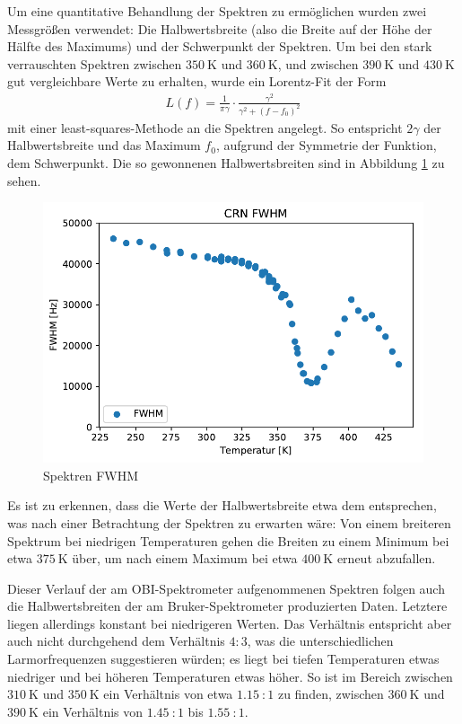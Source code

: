 Um eine quantitative Behandlung der Spektren zu ermöglichen wurden zwei Messgrößen verwendet: Die Halbwertsbreite (also die Breite auf der Höhe der Hälfte des Maximums) und der Schwerpunkt der Spektren. Um bei den stark verrauschten Spektren zwischen $\SI{350}{\kelvin}$ und $\SI{360}{\kelvin}$, und zwischen $\SI{390}{\kelvin}$ und $\SI{430}{\kelvin}$ gut vergleichbare Werte zu erhalten, wurde ein Lorentz-Fit der Form
\begin{align}
	L(f) = \frac{1}{\pi \gamma} \cdot \frac{\gamma^2}{\gamma^2 + (f - f_0)^2} \label{eqn:res:lorentz}
\end{align}
mit einer least-squares-Methode an die Spektren angelegt. So entspricht $2 \gamma$ der Halbwertsbreite und das Maximum $f_0$, aufgrund der Symmetrie der Funktion, dem Schwerpunkt. Die so gewonnenen Halbwertsbreiten sind in Abbildung \ref{fig:res:spek_fwhm} zu sehen.
\begin{figure}
	\begin{center}
		\includegraphics[width=\textwidth]{graphics/plots/SPEK/spek_fwhm.pdf}
	\end{center}
	\caption{Spektren FWHM} \label{fig:res:spek_fwhm}
\end{figure}
Es ist zu erkennen, dass die Werte der Halbwertsbreite etwa dem entsprechen, was nach einer Betrachtung der Spektren zu erwarten wäre: Von einem breiteren Spektrum bei niedrigen Temperaturen gehen die Breiten zu einem Minimum bei etwa $\SI{375}{\kelvin}$ über, um nach einem Maximum bei etwa $\SI{400}{\kelvin}$ erneut abzufallen.

Dieser Verlauf der am OBI-Spektrometer aufgenommenen Spektren folgen auch die Halbwertsbreiten der am Bruker-Spektrometer produzierten Daten. Letztere liegen allerdings konstant bei niedrigeren Werten. Das Verhältnis entspricht aber auch nicht durchgehend dem Verhältnis $4:3$, was die unterschiedlichen Larmorfrequenzen suggestieren würden; es liegt bei tiefen Temperaturen etwas niedriger und bei höheren Temperaturen etwas höher. So ist im Bereich zwischen $\SI{310}{\kelvin}$ und $\SI{350}{\kelvin}$ ein Verhältnis von etwa $\SI{1.15}{}:1$ zu finden, zwischen $\SI{360}{\kelvin}$ und $\SI{390}{\kelvin}$ ein Verhältnis von $\SI{1.45}{}:1$ bis $\SI{1.55}{}:1$.

